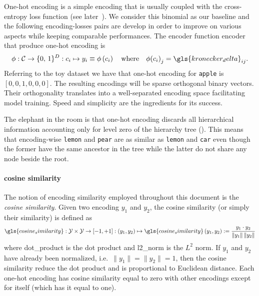 One-hot encoding is a simple encoding that is usually coupled with the cross-entropy loss function (see later~). We consider this binomial as our baseline and the following encoding-losses pairs are develop in order to improve on various aspects while keeping comparable performances.
The encoder function \gls{encoder} that produce one-hot encoding is
\begin{equation}
  \phi: \mathcal{C} \to \{0, \,1\}^{D}
      : c_i \mapsto y_i \equiv \phi \left(c_i\right)
  \quad \text{where} \quad
  \phi{\left(c_i\right)}_j = \gls{kronecker_delta}_{ij}.
  \label{eq:one-hot-encoding}
\end{equation}
Referring to the toy dataset we have that one-hot encoding for \texttt{apple} is $\left[0, 0, 1, 0, 0, 0\right]$. The resulting encodings will be sparse orthogonal binary vectors. Their orthogonality translates into a well-separated encoding space facilitating model training. Speed and simplicity are the ingredients for its success.

The elephant in the room is that one-hot encoding discards all hierarchical information accounting only for level zero of the hierarchy tree (). This means that encoding-wise \texttt{lemon} and \texttt{pear} are as similar as \texttt{lemon} and \texttt{car} even though the former have the same ancestor in the tree while the latter do not share any node beside the root.

\paragraph{cosine similarity} The notion of encoding similarity employed
throughout this document is the \emph{cosine similarity}. Given two encoding $y_1$ and $y_2$, the cosine similarity (or simply their similarity) is defined as
\begin{equation}
  \gls{cosine_similarity}: \mathcal{Y} \times \mathcal{Y} \to \left[-1, +1\right]
  : (y_1, y_2) \mapsto \gls{cosine_similarity} \,(y_1, y_2) :=
  \frac{y_1 \cdot y_2}{\|y_1\| \, \|y_2\|}
  \label{eq:cosine-simiarity}
\end{equation}
where \gls{dot_product} is the dot product and \gls{l2_norm} is the $L^2$ norm.
If $y_1$ and $y_2$ have already been normalized, i.e.\ $\|y_1\| = \|y_2\| = 1$, then the cosine similarity reduce the dot product and is proportional to Euclidean distance. Each one-hot encoding has cosine similarity equal to zero with other encodings except for itself (which has it equal to one).


